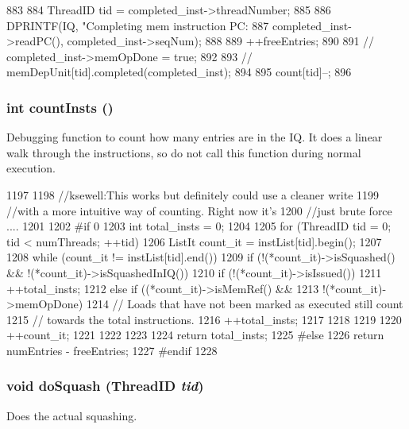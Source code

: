 \begin{DoxyCode}
883 {
884     ThreadID tid = completed_inst->threadNumber;
885 
886     DPRINTF(IQ, "Completing mem instruction PC:%
887             completed_inst->readPC(), completed_inst->seqNum);
888 
889     ++freeEntries;
890 
891 //    completed_inst->memOpDone = true;
892 
893 //    memDepUnit[tid].completed(completed_inst);
894 
895     count[tid]--;
896 }
\end{DoxyCode}
\hypertarget{classInstQueue_ab654970f03abd90f0c397bba8e218bc9}{
\subsubsection[{countInsts}]{\setlength{\rightskip}{0pt plus 5cm}int countInsts ()}}
\label{classInstQueue_ab654970f03abd90f0c397bba8e218bc9}
Debugging function to count how many entries are in the IQ. It does a linear walk through the instructions, so do not call this function during normal execution. 


\begin{DoxyCode}
1197 {
1198     //ksewell:This works but definitely could use a cleaner write
1199     //with a more intuitive way of counting. Right now it's
1200     //just brute force ....
1201 
1202 #if 0
1203     int total_insts = 0;
1204 
1205     for (ThreadID tid = 0; tid < numThreads; ++tid) {
1206         ListIt count_it = instList[tid].begin();
1207 
1208         while (count_it != instList[tid].end()) {
1209             if (!(*count_it)->isSquashed() && !(*count_it)->isSquashedInIQ()) {
1210                 if (!(*count_it)->isIssued()) {
1211                     ++total_insts;
1212                 } else if ((*count_it)->isMemRef() &&
1213                            !(*count_it)->memOpDone) {
1214                     // Loads that have not been marked as executed still count
1215                     // towards the total instructions.
1216                     ++total_insts;
1217                 }
1218             }
1219 
1220             ++count_it;
1221         }
1222     }
1223 
1224     return total_insts;
1225 #else
1226     return numEntries - freeEntries;
1227 #endif
1228 }
\end{DoxyCode}
\hypertarget{classInstQueue_a06cf52c4f09162bea03ec848f247151a}{
\subsubsection[{doSquash}]{\setlength{\rightskip}{0pt plus 5cm}void doSquash ({\bf ThreadID} {\em tid})}}
\label{classInstQueue_a06cf52c4f09162bea03ec848f247151a}
Does the actual squashing. 



